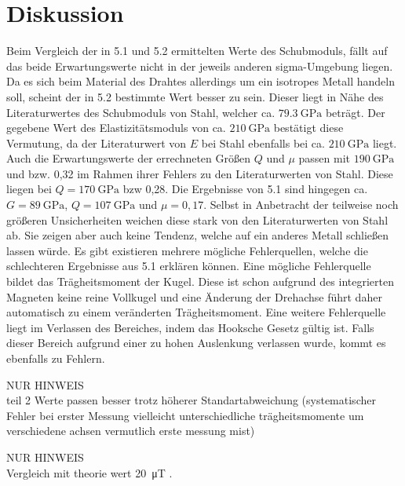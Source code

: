 
\section{Diskussion}
\label{sec:Diskussion}


Beim Vergleich der in 5.1 und 5.2 ermittelten Werte des Schubmoduls, fällt auf
 das beide Erwartungswerte nicht in der jeweils anderen sigma-Umgebung liegen.
 Da es sich beim Material des Drahtes allerdings um ein isotropes Metall handeln
  soll, scheint der in 5.2 bestimmte Wert besser zu sein. Dieser liegt in Nähe
  des Literaturwertes des Schubmoduls von Stahl, welcher ca. $\SI{79.3}{\giga\pascal}$\cite{EinführungMechanik} beträgt.
   Der gegebene Wert des Elastizitätsmoduls von ca. $\SI{210}{\giga\pascal}$
    bestätigt diese Vermutung, da der Literaturwert von $E$ bei Stahl ebenfalls
     bei ca. $\SI{210}{\giga\pascal}$\cite[624\psq]{TaschenbuchPhysik} liegt.
     Auch die Erwartungswerte der errechneten Größen $Q$ und $\mu$ passen mit
      $\SI{190}{\giga\pascal}$ und bzw. 0,32 im Rahmen ihrer Fehlers zu den Literaturwerten von Stahl.
      Diese liegen bei $Q = \SI{170}{\giga\pascal}$\cite{QundMu} bzw 0,28\cite{QundMu}.
      Die Ergebnisse von 5.1 sind hingegen ca. $G =\SI{89}{\giga\pascal}$, $Q = \SI{107}{\giga\pascal}$ und $\mu = 0,17$.
      Selbst in Anbetracht der teilweise noch größeren Unsicherheiten weichen
      diese stark von den Literaturwerten von Stahl ab. Sie zeigen aber auch
      keine Tendenz, welche auf ein anderes Metall schließen lassen würde.
     Es gibt existieren mehrere mögliche Fehlerquellen, welche die schlechteren
      Ergebnisse aus 5.1 erklären können. Eine mögliche Fehlerquelle bildet das
       Trägheitsmoment der Kugel. Diese ist schon aufgrund des integrierten
        Magneten keine reine Vollkugel und eine Änderung der Drehachse führt daher
         automatisch zu einem veränderten Trägheitsmoment. Eine weitere
          Fehlerquelle liegt im Verlassen des Bereiches, indem das Hooksche
           Gesetz gültig ist. Falls dieser Bereich aufgrund einer zu hohen
            Auslenkung verlassen wurde, kommt es ebenfalls zu Fehlern.



NUR HINWEIS\\teil 2
Werte passen besser trotz höherer Standartabweichung (systematischer Fehler bei erster Messung vielleicht unterschiedliche trägheitsmomente um verschiedene achsen vermutlich erste messung mist)

NUR HINWEIS\\
Vergleich mit theorie wert \SI{20}{\micro\tesla} \cite{Erdmagnetfeld}.
